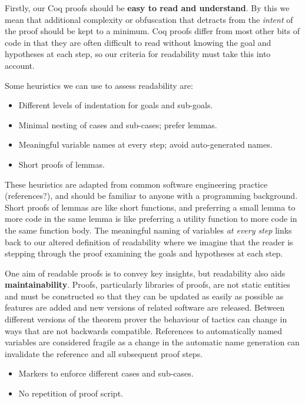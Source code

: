 \documentclass[]{unswthesis}
\let\i\textit
\let\b\textbf
\begin{document}
Firstly, our Coq proofs should be \b{easy to read and understand}. By this we mean that additional complexity or obfuscation that detracts from the \i{intent} of the proof should be kept to a minimum. Coq proofs differ from most other bits of code in that they are often difficult to read without knowing the goal and hypotheses at each step, so our criteria for readability must take this into account.

Some heuristics we can use to assess readability are:

\begin{itemize}
\item Different levels of indentation for goals and sub-goals.
\item Minimal nesting of cases and sub-cases; prefer lemmas.
\item Meaningful variable names at every step; avoid auto-generated names.
\item Short proofs of lemmas.
\end{itemize}

These heuristics are adapted from common software engineering practice (references?), and should be familiar to anyone with a programming background. Short proofs of lemmas are like short functions, and preferring a small lemma to more code in the same lemma is like preferring a utility function to more code in the same function body. The meaningful naming of variables \i{at every step} links back to our altered definition of readability where we imagine that the reader is stepping through the proof examining the goals and hypotheses at each step.

One aim of readable proofs is to convey key insights, but readability also aids \b{maintainability}. Proofs, particularly libraries of proofs, are not static entities and must be constructed so that they can be updated as easily as possible as features are added and new versions of related software are released. Between different versions of the theorem prover the behaviour of tactics can change in ways that are not backwards compatible. References to automatically named variables are considered fragile as a change in the automatic name generation can invalidate the reference and all subsequent proof steps.

\begin{itemize}
\item Markers to enforce different cases and sub-cases.
\item No repetition of proof script.
\end{itemize}
\end{document}
